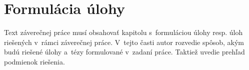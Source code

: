\chapter{Formulácia úlohy}

Text záverečnej práce musí obsahovať\/ kapitolu s~formuláciou úlohy resp. úloh riešených v~rámci záverečnej práce. V~tejto časti autor rozvedie spôsob, akým budú riešené úlohy a~tézy formulované v~zadaní práce. Taktiež uvedie prehľad podmienok riešenia.
